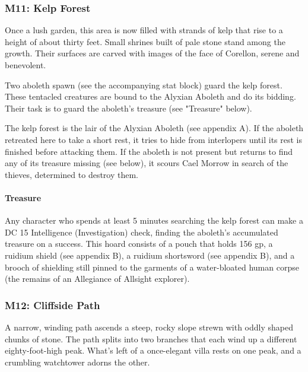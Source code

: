 \documentclass[10pt,a4paper,twoside,bg=print,twocolumn,openany,nodeprecatedcode]{dndbook}
\begin{document}
\subsubsection{M11: Kelp Forest}


\begin{DndReadAloud}{}
Once a lush garden, this area is now filled with strands of kelp that rise to a height of about thirty feet. Small shrines built of pale stone stand among the growth. Their surfaces are carved with images of the face of Corellon, serene and benevolent.

\end{DndReadAloud}

Two aboleth spawn (see the accompanying stat block) guard the kelp forest. These tentacled creatures are bound to the Alyxian Aboleth and do its bidding. Their task is to guard the aboleth's treasure (see "Treasure" below).

The kelp forest is the lair of the Alyxian Aboleth (see appendix A). If the aboleth retreated here to take a short rest, it tries to hide from interlopers until its rest is finished before attacking them. If the aboleth is not present but returns to find any of its treasure missing (see below), it scours Cael Morrow in search of the thieves, determined to destroy them.

\paragraph{Treasure}
Any character who spends at least 5 minutes searching the kelp forest can make a DC 15 Intelligence (Investigation) check, finding the aboleth's accumulated treasure on a success. This hoard consists of a pouch that holds 156 gp, a ruidium shield (see appendix B), a ruidium shortsword (see appendix B), and a brooch of shielding still pinned to the garments of a water-bloated human corpse (the remains of an Allegiance of Allsight explorer).


\subsubsection{M12: Cliffside Path}
\begin{DndReadAloud}{}
A narrow, winding path ascends a steep, rocky slope strewn with oddly shaped chunks of stone. The path splits into two branches that each wind up a different eighty-foot-high peak. What's left of a once-elegant villa rests on one peak, and a crumbling watchtower adorns the other.

\end{DndReadAloud}
\end{document}
